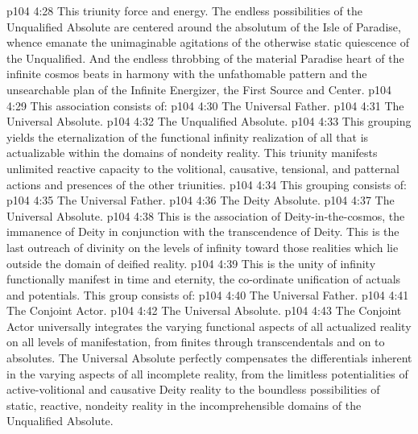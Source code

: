 \vs p104 4:28 This triunity  force and energy. The endless possibilities of the Unqualified Absolute are centered around the absolutum of the Isle of Paradise, whence emanate the unimaginable agitations of the otherwise static quiescence of the Unqualified. And the endless throbbing of the material Paradise heart of the infinite cosmos beats in harmony with the unfathomable pattern and the unsearchable plan of the Infinite Energizer, the First Source and Center.
\pc \vs p104 4:29  This association consists of:
\pc \vs p104 4:30 \bibnobreakspace The Universal Father.
\vs p104 4:31 \bibnobreakspace The Universal Absolute.
\vs p104 4:32 \bibnobreakspace The Unqualified Absolute.
\pc \vs p104 4:33 This grouping yields the eternalization of the functional infinity realization of all that is actualizable within the domains of nondeity reality. This triunity manifests unlimited reactive capacity to the volitional, causative, tensional, and patternal actions and presences of the other triunities.
\pc \vs p104 4:34  This grouping consists of:
\pc \vs p104 4:35 \bibnobreakspace The Universal Father.
\vs p104 4:36 \bibnobreakspace The Deity Absolute.
\vs p104 4:37 \bibnobreakspace The Universal Absolute.
\vs p104 4:38 This is the association of Deity\hyp{}in\hyp{}the\hyp{}cosmos, the immanence of Deity in conjunction with the transcendence of Deity. This is the last outreach of divinity on the levels of infinity toward those realities which lie outside the domain of deified reality.
\pc \vs p104 4:39  This is the unity of infinity functionally manifest in time and eternity, the co\hyp{}ordinate unification of actuals and potentials. This group consists of:
\pc \vs p104 4:40 \bibnobreakspace The Universal Father.
\vs p104 4:41 \bibnobreakspace The Conjoint Actor.
\vs p104 4:42 \bibnobreakspace The Universal Absolute.
\pc \vs p104 4:43 The Conjoint Actor universally integrates the varying functional aspects of all actualized reality on all levels of manifestation, from finites through transcendentals and on to absolutes. The Universal Absolute perfectly compensates the differentials inherent in the varying aspects of all incomplete reality, from the limitless potentialities of active\hyp{}volitional and causative Deity reality to the boundless possibilities of static, reactive, nondeity reality in the incomprehensible domains of the Unqualified Absolute.
